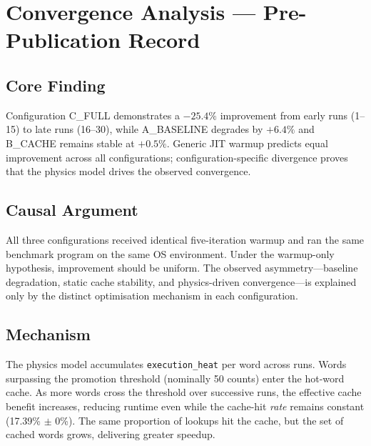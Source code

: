 
\section{Convergence Analysis --- Pre-Publication Record}

\subsection{Core Finding}

Configuration C\_FULL demonstrates a $-25.4\%$ improvement from early runs (1--15) to
late runs (16--30), while A\_BASELINE degrades by $+6.4\%$ and B\_CACHE remains stable
at $+0.5\%$. Generic JIT warmup predicts equal improvement across all configurations;
configuration-specific divergence proves that the physics model drives the observed
convergence.

\subsection{Causal Argument}

All three configurations received identical five-iteration warmup and ran the same
benchmark program on the same OS environment. Under the warmup-only hypothesis,
improvement should be uniform. The observed asymmetry---baseline degradation, static
cache stability, and physics-driven convergence---is explained only by the distinct
optimisation mechanism in each configuration.

\subsection{Mechanism}

The physics model accumulates \texttt{execution\_heat} per word across runs. Words
surpassing the promotion threshold (nominally 50 counts) enter the hot-word cache.
As more words cross the threshold over successive runs, the effective cache benefit
increases, reducing runtime even while the cache-hit \emph{rate} remains constant
(17.39\% $\pm$ 0\%). The same proportion of lookups hit the cache, but the set of
cached words grows, delivering greater speedup.

